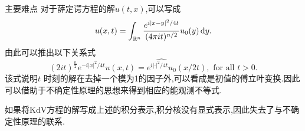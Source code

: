 \iffalse
\begin{frame}[t]
  Consider the following linear Korteweg-de Vries (KdV) equation
  \begin{equation}\label{3}
    \partial_t u +\partial_x^3u=0,\quad u(0,x)=u_0(x)\in L^2(\R).
  \end{equation}
  Our aim is to prove the observability inequality at two points in time as (\ref{obsch}) for (\ref{3}),

  i.e.,
  \begin{equation}\label{7}
    \int_{\R}|u_0(x)|^2\,\mathrm{d}x\le C \left( \int_{\R\setminus S}|u_0(x)|^2\,\mathrm{d}x + \int_{\R\setminus \Sigma} |u(t,x)|\,\mathrm{d}x  \right), 
  \end{equation}
  where $C$ is a constant depending on $t$ and finite sets $S$ and $\Sigma$. 
\end{frame}
\fi

\begin{frame}[t]{主要难点}
  对于薛定谔方程的解$u(t,x)$,可以写成
  \[
    u(x,t)=\int_{\mathbb{R}^{n}}\frac{e^{i|x-y|^2 /4t} }{(4\pi it)^{n /2}}u_0(y)\,\mathrm{d}y.
  \] 
  由此可以推出以下关系式
  \begin{equation}\label{rel}
    (2it)^{\frac{n}{2}}e^{-i|x|^2 /4t}u(x,t)=\widehat{e^{i|\cdot |^2 /4t}u_0}(x /2t), \text{ for all }t>0.
  \end{equation}
  该式说明$t$ 时刻的解在去掉一个模为1的因子外,可以看成是初值的傅立叶变换.因此可以借助于不确定性原理的思想来得到相应的能观测不等式.

如果将KdV方程的解写成上述的积分表示,积分核没有显式表示,因此失去了与不确定性原理的联系.
\end{frame}


